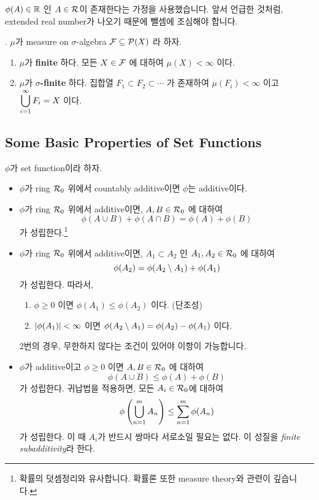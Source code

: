 \(\phi(A) \in \mathbb{R}\) 인 \(A \in \mathcal{R}\)이 존재한다는 가정을 사용했습니다. 앞서 언급한 것처럼, extended real number가 나오기 때문에 뺄셈에 조심해야 합니다.

\medskip

. \(\mu\)가 measure on \(\sigma\)-algebra \(\mathcal{F} \subseteq \mathcal{P}(X)\) 라 하자.
\begin{enumerate}
    \item \(\mu\)가 \textbf{finite} 하다. \miff 모든 \(X \in \mathcal{F}\) 에 대하여 \(\mu(X) < \infty\) 이다.
    \item \(\mu\)가 \textbf{\(\sigma\)-finite} 하다. \miff 집합열 \(F_1 \subset F_2 \subset \cdots\) 가 존재하여 \(\mu(F_i) < \infty \) 이고 \(\displaystyle \bigcup_{i=1}^\infty F_i = X\) 이다.
\end{enumerate}

\subsection*{Some Basic Properties of Set Functions}

\(\phi\)가 set function이라 하자.

\begin{itemize}
    \item \(\phi\)가 ring \(\mathcal{R}_0\) 위에서 countably additive이면 \(\phi\)는 additive이다.

    \item \(\phi\)가 ring \(\mathcal{R}_0\) 위에서 additive이면, \(A, B \in \mathcal{R}_0\) 에 대하여
          \[
              \phi(A\cup B) + \phi(A\cap B) = \phi(A) + \phi(B)
          \]
          가 성립한다.\footnote{확률의 덧셈정리와 유사합니다. 확률론 또한 measure theory와 관련이 깊습니다.}

    \item \(\phi\)가 ring \(\mathcal{R}_0\) 위에서 additive이면, \(A_1 \subset A_2\) 인 \(A_1, A_2 \in \mathcal{R}_0\) 에 대하여
          \[
              \phi(A_2) = \phi(A_2 \setminus A_1) + \phi(A_1)
          \]
          가 성립한다. 따라서,
          \begin{enumerate}
              \item \(\phi \geq 0\) 이면 \(\phi(A_1) \leq \phi(A_2)\) 이다. (단조성)
              \item \(\left| \phi(A_1) \right| < \infty\) 이면 \(\phi(A_2 \setminus A_1) = \phi(A_2) - \phi(A_1)\) 이다.
          \end{enumerate}

          2번의 경우, 무한하지 않다는 조건이 있어야 이항이 가능합니다.

    \item \(\phi\)가 additive이고 \(\phi \geq 0\) 이면 \(A, B \in \mathcal{R}_0\) 에 대하여
          \[
              \phi(A\cup B) \leq \phi(A) + \phi(B)
          \]
          가 성립한다. 귀납법을 적용하면, 모든 \(A_i \in \mathcal{R}_0\)에 대하여
          \[
              \phi\left( \bigcup_{n=1}^m A_n \right) \leq \sum_{n=1}^m \phi(A_n)
          \]
          가 성립한다. 이 때 \(A_i\)가 반드시 쌍마다 서로소일 필요는 없다. 이 성질을 \textit{finite subadditivity}라 한다.
\end{itemize}

